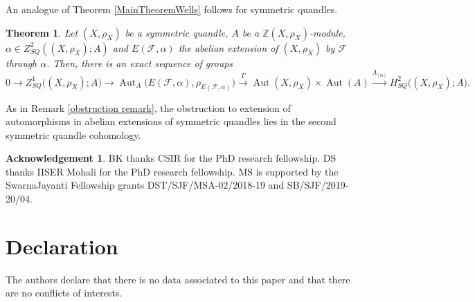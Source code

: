 \documentclass[11pt,reqno]{amsart}
\newtheorem{theorem}{Theorem}[section]
\theoremstyle{definition}
\numberwithin{equation}{subsection}
\newtheorem*{ack}{Acknowledgement}
\begin{document}
\medskip	

An analogue of Theorem \ref{MainTheoremWells} follows for symmetric quandles. 

\begin{theorem} \label{MainTheoremWellsQuandles}
Let $(X, \rho_{X})$ be a symmetric quandle, $A$ be a $\mathbb{Z}(X, \rho_{X})$-module, $\alpha \in Z_{S Q}^{2}((X, \rho_{X}) ; A)$ and $E(\mathcal{F}, \alpha)$ the abelian extension of $(X, \rho_{X})$ by $\mathcal{F}$ through $\alpha$. Then, there is an exact sequence of groups
$$ 0\to Z_{SQ}^{1} \big((X, \rho_{X});A \big)\to \operatorname{Aut}_{A} \big(E(\mathcal{F}, \alpha), \rho_{E(\mathcal{F}, \alpha)} \big) \stackrel{\Gamma}{\to}  \operatorname{Aut} (X, \rho_{X})\times\operatorname{Aut}(A) \stackrel{\Lambda_{[\alpha]}}{\to}  H_{SQ}^{2} \big((X,\rho_{X});A \big).$$
\end{theorem}


As in Remark \ref{obstruction remark}, the obstruction to extension of automorphisms in abelian extensions of symmetric quandles lies in the second symmetric quandle cohomology.
\medskip


\begin{ack}
BK thanks CSIR for the PhD research fellowship. DS thanks IISER Mohali for the PhD research fellowship. MS is supported by the SwarnaJayanti Fellowship
grants DST/SJF/MSA-02/2018-19 and SB/SJF/2019-20/04.
\end{ack}

\section{Declaration}
The authors declare that there is no data associated to this paper and that there are no conflicts of interests.
\medskip
\end{document}
